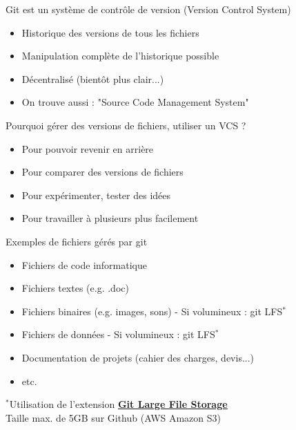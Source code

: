 \documentclass[a4paper,11pt]{beamer}
\begin{document}
\begin{frame}
    \begin{block}{Git est un système de contrôle de version (Version Control System)}
        \begin{itemize}
            \item Historique des versions de tous les fichiers
            \item Manipulation complète de l'historique possible
            \item Décentralisé (bientôt plus clair...)
            \item On trouve aussi : "Source Code Management System"
        \end{itemize}
    \end{block}
    \pause
    \begin{block}{Pourquoi gérer des versions de fichiers, utiliser un VCS ?}
        \begin{itemize}
            \item Pour pouvoir revenir en arrière
            \item Pour comparer des versions de fichiers
            \item Pour expérimenter, tester des idées
            \item Pour travailler à plusieurs plus facilement
        \end{itemize}
    \end{block}
    
\end{frame}

\begin{frame}
\centering {\huge \textbf{\textcolor{red}{Vous pouvez gérer tous types de fichiers avec git !}}}
\begin{block}{Exemples de fichiers gérés par git}
\begin{itemize}
\item Fichiers de code informatique
\item Fichiers textes (e.g. .doc)
\item Fichiers binaires (e.g. images, sons) - Si volumineux : git LFS$^{*}$
\item Fichiers de données - Si volumineux : git LFS$^{*}$
\item Documentation de projets (cahier des charges, devis...)
\item etc.
\end{itemize}
\end{block}
\vspace{.25cm}

\centering {\huge \textbf{\textcolor{red}{Gestion collaborative de projets}}}
\vspace{.25cm}

\footnotesize $^{*}$Utilisation de l'extension \textcolor{blue}{\textbf{\underline{\href{https://git-lfs.com/}{Git Large File Storage}}}}\\
Taille max. de 5GB sur Github (AWS Amazon S3)

\end{frame}
\end{document}

